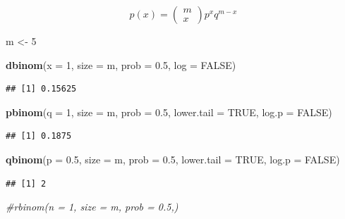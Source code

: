 \documentclass[]{article}
\newenvironment{Shaded}{\begin{snugshade}}{\end{snugshade}}
\newcommand{\CommentTok}[1]{\textcolor[rgb]{0.56,0.35,0.01}{\textit{#1}}}
\newcommand{\DataTypeTok}[1]{\textcolor[rgb]{0.13,0.29,0.53}{#1}}
\newcommand{\DecValTok}[1]{\textcolor[rgb]{0.00,0.00,0.81}{#1}}
\newcommand{\FloatTok}[1]{\textcolor[rgb]{0.00,0.00,0.81}{#1}}
\newcommand{\KeywordTok}[1]{\textcolor[rgb]{0.13,0.29,0.53}{\textbf{#1}}}
\newcommand{\NormalTok}[1]{#1}
\newcommand{\OtherTok}[1]{\textcolor[rgb]{0.56,0.35,0.01}{#1}}
\newcommand{\StringTok}[1]{\textcolor[rgb]{0.31,0.60,0.02}{#1}}
\begin{document}
\[p(x) = \left(\begin{array}{l}{m} \\ {x}\end{array}\right) p^{x}q^{m-x}\]

\begin{Shaded}
\begin{Highlighting}[]
\NormalTok{m <-}\StringTok{ }\DecValTok{5}

\KeywordTok{dbinom}\NormalTok{(}\DataTypeTok{x =} \DecValTok{1}\NormalTok{,   }\DataTypeTok{size =}\NormalTok{ m, }\DataTypeTok{prob =} \FloatTok{0.5}\NormalTok{, }\DataTypeTok{log =} \OtherTok{FALSE}\NormalTok{)}
\end{Highlighting}
\end{Shaded}

\begin{verbatim}
## [1] 0.15625
\end{verbatim}

\begin{Shaded}
\begin{Highlighting}[]
\KeywordTok{pbinom}\NormalTok{(}\DataTypeTok{q =} \DecValTok{1}\NormalTok{,   }\DataTypeTok{size =}\NormalTok{ m, }\DataTypeTok{prob =} \FloatTok{0.5}\NormalTok{, }\DataTypeTok{lower.tail =} \OtherTok{TRUE}\NormalTok{, }\DataTypeTok{log.p =} \OtherTok{FALSE}\NormalTok{)}
\end{Highlighting}
\end{Shaded}

\begin{verbatim}
## [1] 0.1875
\end{verbatim}

\begin{Shaded}
\begin{Highlighting}[]
\KeywordTok{qbinom}\NormalTok{(}\DataTypeTok{p =} \FloatTok{0.5}\NormalTok{, }\DataTypeTok{size =}\NormalTok{ m, }\DataTypeTok{prob =} \FloatTok{0.5}\NormalTok{, }\DataTypeTok{lower.tail =} \OtherTok{TRUE}\NormalTok{, }\DataTypeTok{log.p =} \OtherTok{FALSE}\NormalTok{)}
\end{Highlighting}
\end{Shaded}

\begin{verbatim}
## [1] 2
\end{verbatim}

\begin{Shaded}
\begin{Highlighting}[]
\CommentTok{#rbinom(n = 1,   size = m, prob = 0.5,)}
\end{Highlighting}
\end{Shaded}
\end{document}
